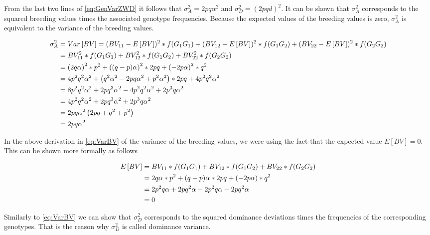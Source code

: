\documentclass[]{book}
\theoremstyle{definition}
\theoremstyle{definition}
\theoremstyle{definition}
\theoremstyle{remark}
\begin{document}
From the last two lines of \eqref{eq:GenVarZWD} it follows that \(\sigma_A^2 = 2pq\alpha^2\) and \(\sigma_D^2 = \left(2pqd \right)^2\). It can be shown that \(\sigma_A^2\) corresponds to the squared breeding values times the associated genotype frequencies. Because the expected values of the breeding values is zero, \(\sigma_A^2\) is equivalent to the variance of the breeding values.

\begin{align}
\sigma_A^2 &= Var\left[ BV \right] = (BV_{11} - E\left[ BV \right])^2 * f(G_1G_1) 
              + (BV_{12} - E\left[ BV \right])^2 * f(G_1G_2) 
              + (BV_{22} - E\left[ BV \right])^2 * f(G_2G_2) \notag \\
           &= BV_{11}^2 * f(G_1G_1) + BV_{12}^2 * f(G_1G_2) + BV_{22}^2 * f(G_2G_2) \notag \\
           &= \left(2q \alpha \right)^2 * p^2 +  \left((q-p) \alpha \right)^2 * 2pq + \left(-2p \alpha \right)^2 * q^2 \notag \\
           &= 4p^2 q^2 \alpha^2 + \left(q^2 \alpha^2 -2pq\alpha^2 + p^2 \alpha^2 \right) * 2pq + 4p^2q^2\alpha^2 \notag \\
           &= 8p^2 q^2 \alpha^2 + 2pq^3\alpha^2 -4p^2q^2\alpha^2 + 2p^3q\alpha^2 \notag \\
           &= 4p^2 q^2 \alpha^2 + 2pq^3\alpha^2  + 2p^3q\alpha^2 \notag \\
           &= 2pq\alpha^2 \left(2pq + q^2 + p^2 \right) \notag \\
           &= 2pq\alpha^2
\label{eq:VarBV}
\end{align}

In the above derivation in \eqref{eq:VarBV} of the variance of the breeding values, we were using the fact that the expected value \(E\left[ BV \right]=0\). This can be shown more formally as follows

\begin{align}
E\left[ BV \right]  &=  BV_{11} * f(G_1G_1) + BV_{12} * f(G_1G_2)  + BV_{22} * f(G_2G_2) \notag \\
                    &=  2q \alpha * p^2 + (q-p) \alpha * 2pq + (-2p \alpha) * q^2 \notag \\
                    &=  2p^2q \alpha + 2pq^2 \alpha - 2p^2q\alpha - 2pq^2\alpha \notag \\
                    &=  0
\label{eq:ExpectedValueBV}
\end{align}

Similarly to \eqref{eq:VarBV} we can show that \(\sigma_D^2\) corresponds to the squared dominance deviations times the frequencies of the corresponding genotypes. That is the reason why \(\sigma_D^2\) is called dominance variance.
\end{document}
